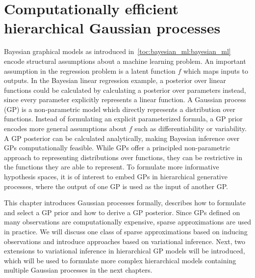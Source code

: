 \chapter{Computationally efficient hierarchical Gaussian processes}
\label{toc:gp}
Bayesian graphical models as introduced in~\cref{toc:bayesian_ml:bayesian_ml} encode structural assumptions about a machine learning problem.
An important assumption in the regression problem is a latent function $f$ which maps inputs to outputs.
In the Bayesian linear regression example, a posterior over linear functions could be calculated by calculating a posterior over parameters instead, since every parameter explicitly represents a linear function.
A Gaussian process (GP) is a non-parametric model which directly represents a distribution over functions.
Instead of formulating an explicit parameterized formula, a GP prior encodes more general assumptions about $f$ such as differentiability or variability.
A GP posterior can be calculated analytically, making Bayesian inference over GPs computationally feasible.
While GPs offer a principled non-parametric approach to representing distributions over functions, they can be restrictive in the functions they are able to represent.
To formulate more informative hypothesis spaces, it is of interest to embed GPs in hierarchical generative processes, where the output of one GP is used as the input of another GP.

This chapter introduces Gaussian processes formally, describes how to formulate and select a GP prior and how to derive a GP posterior.
Since GPs defined on many observations are computationally expensive, sparse approximations are used in practice.
We will discuss one class of sparse approximations based on inducing observations and introduce approaches based on variational inference.
Next, two extensions to variational inference in hierarchical GP models will be introduced, which will be used to formulate more complex hierarchical models containing multiple Gaussian processes in the next chapters.

